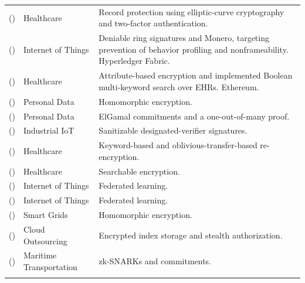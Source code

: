\begin{longtable}{@{}>{\raggedright\arraybackslash}m{}>{\raggedright\arraybackslash}m{}>{\raggedright\arraybackslash}m{}@{}}
\addlinespace[5pt]
\cite{2021-cp-bdhca} (\citeyear{2021-cp-bdhca}) & Healthcare & Record protection using elliptic-curve cryptography and two-factor authentication. \\
\addlinespace[5pt]
\cite{2022-bc-based-privacy-pres-reward} (\citeyear{2022-bc-based-privacy-pres-reward}) & Internet of Things & Deniable ring signatures and Monero, targeting prevention of behavior profiling and nonframeability. Hyperledger Fabric. \\
\addlinespace[5pt]
\cite{2021-medshare} (\citeyear{2021-medshare}) & Healthcare & Attribute-based encryption and implemented Boolean multi-keyword search over EHRs. Ethereum. \\
\addlinespace[5pt]
\cite{10.1109/tr.2022.3190932} (\citeyear{10.1109/tr.2022.3190932}) & Personal Data & Homomorphic encryption. \\
\addlinespace[5pt]
\cite{10.1109/jiot.2023.3242959} (\citeyear{10.1109/jiot.2023.3242959}) & Personal Data & ElGamal commitments and a one-out-of-many proof. \\
\addlinespace[5pt]
\cite{10.1109/tifs.2023.3297327} (\citeyear{10.1109/tifs.2023.3297327}) & Industrial IoT & Sanitizable designated-verifier signatures. \\
\addlinespace[5pt]
\cite{10.1007/s12083-023-01521-w} (\citeyear{10.1007/s12083-023-01521-w}) & Healthcare & Keyword-based and oblivious-transfer-based re-encryption. \\
\addlinespace[5pt]
\cite{10.1109/jiot.2023.3287636} (\citeyear{10.1109/jiot.2023.3287636}) & Healthcare & Searchable encryption. \\
\addlinespace[5pt]
\cite{10.1109/jiot.2023.3295763} (\citeyear{10.1109/jiot.2023.3295763}) & Internet of Things & Federated learning. \\
\addlinespace[5pt]
\cite{10.1109/jiot.2021.3134755} (\citeyear{10.1109/jiot.2021.3134755}) & Internet of Things & Federated learning. \\
\addlinespace[5pt]
\cite{10.1109/jiot.2023.3247487} (\citeyear{10.1109/jiot.2023.3247487}) & Smart Grids & Homomorphic encryption. \\
\addlinespace[5pt]
\cite{10.1109/tsc.2022.3199111} (\citeyear{10.1109/tsc.2022.3199111}) & Cloud Outsourcing & Encrypted index storage and stealth authorization. \\
\addlinespace[5pt]
\cite{10.1109/tits.2022.3190487} (\citeyear{10.1109/tits.2022.3190487}) & Maritime Transportation & zk-SNARKs and commitments. \\
\addlinespace[5pt]

\end{longtable}
